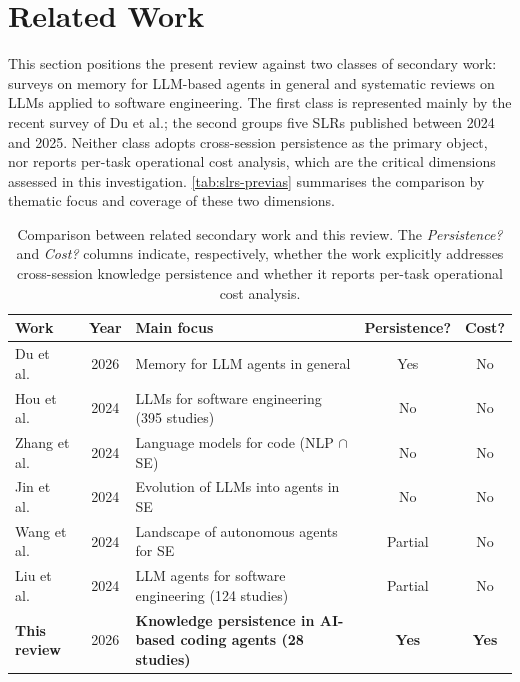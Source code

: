 \section{Related Work}
\label{sec:trabalhos-relacionados}


This section positions the present review against two classes of
secondary work: surveys on memory for LLM-based agents in general and
systematic reviews on LLMs applied to software engineering.
The first class is represented mainly by the recent survey of Du et al.;
the second groups five SLRs published between 2024 and 2025.
Neither class adopts cross-session persistence as the primary object,
nor reports per-task operational cost analysis, which are the critical
dimensions assessed in this investigation.
\autoref{tab:slrs-previas} summarises the comparison by thematic focus
and coverage of these two dimensions.

\begin{table}[htbp]
\centering
\caption{Comparison between related secondary work and this review.
The \emph{Persistence?} and \emph{Cost?} columns indicate, respectively,
whether the work explicitly addresses cross-session knowledge
persistence and whether it reports per-task operational cost analysis.}
\label{tab:slrs-previas}
\small
\begin{tabularx}{\textwidth}{l c X c c}
\toprule
\textbf{Work} & \textbf{Year} & \textbf{Main focus} &
  \textbf{Persistence?} & \textbf{Cost?} \\
\midrule
Du et al.~\citep{du2026memory} & 2026 &
  Memory for LLM agents in general &
  Yes & No \\
Hou et al.~\citep{hou2024llmse} & 2024 &
  LLMs for software engineering (395 studies) &
  No & No \\
Zhang et al.~\citep{zhang2024unifying} & 2024 &
  Language models for code (NLP $\cap$ SE) &
  No & No \\
Jin et al.~\citep{jin2024llmagents} & 2024 &
  Evolution of LLMs into agents in SE &
  No & No \\
Wang et al.~\citep{wang2024llmagents} & 2024 &
  Landscape of autonomous agents for SE &
  Partial & No \\
Liu et al.~\citep{liu2024llmagents} & 2024 &
  LLM agents for software engineering (124 studies) &
  Partial & No \\
\midrule
\textbf{This review} & 2026 &
  \textbf{Knowledge persistence in AI-based coding agents
  (28 studies)} &
  \textbf{Yes} & \textbf{Yes} \\
\bottomrule
\end{tabularx}
\end{table}

